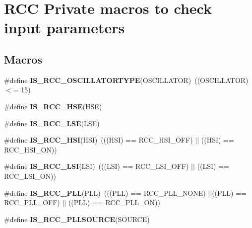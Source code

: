 \hypertarget{group___r_c_c___i_s___r_c_c___definitions}{}\section{R\+CC Private macros to check input parameters}
\label{group___r_c_c___i_s___r_c_c___definitions}
\subsection*{Macros}
\begin{DoxyCompactItemize}
\item 
\mbox{\label{group___r_c_c___i_s___r_c_c___definitions_ga3da0bb3923503cb8e84e5bd75912fbb8}} 
\#define {\bfseries I\+S\+\_\+\+R\+C\+C\+\_\+\+O\+S\+C\+I\+L\+L\+A\+T\+O\+R\+T\+Y\+PE}(O\+S\+C\+I\+L\+L\+A\+T\+OR)~((O\+S\+C\+I\+L\+L\+A\+T\+OR) $<$= 15)
\item 
\#define {\bfseries I\+S\+\_\+\+R\+C\+C\+\_\+\+H\+SE}(H\+SE)
\item 
\#define {\bfseries I\+S\+\_\+\+R\+C\+C\+\_\+\+L\+SE}(L\+SE)
\item 
\mbox{\label{group___r_c_c___i_s___r_c_c___definitions_ga9d2bad5b4ad9ba8fb224ddbd949c27d6}} 
\#define {\bfseries I\+S\+\_\+\+R\+C\+C\+\_\+\+H\+SI}(H\+SI)~(((H\+SI) == R\+C\+C\+\_\+\+H\+S\+I\+\_\+\+O\+FF) $\vert$$\vert$ ((H\+SI) == R\+C\+C\+\_\+\+H\+S\+I\+\_\+\+ON))
\item 
\mbox{\label{group___r_c_c___i_s___r_c_c___definitions_gaaa7381dd9821c69346ce64453863b786}} 
\#define {\bfseries I\+S\+\_\+\+R\+C\+C\+\_\+\+L\+SI}(L\+SI)~(((L\+SI) == R\+C\+C\+\_\+\+L\+S\+I\+\_\+\+O\+FF) $\vert$$\vert$ ((L\+SI) == R\+C\+C\+\_\+\+L\+S\+I\+\_\+\+ON))
\item 
\mbox{\label{group___r_c_c___i_s___r_c_c___definitions_ga373b85039eb8036373fe80948c153ee0}} 
\#define {\bfseries I\+S\+\_\+\+R\+C\+C\+\_\+\+P\+LL}(P\+LL)~(((P\+LL) == R\+C\+C\+\_\+\+P\+L\+L\+\_\+\+N\+O\+NE) $\vert$$\vert$((P\+LL) == R\+C\+C\+\_\+\+P\+L\+L\+\_\+\+O\+FF) $\vert$$\vert$ ((P\+LL) == R\+C\+C\+\_\+\+P\+L\+L\+\_\+\+ON))
\item 
\#define {\bfseries I\+S\+\_\+\+R\+C\+C\+\_\+\+P\+L\+L\+S\+O\+U\+R\+CE}(S\+O\+U\+R\+CE)

\end{DoxyCompactItemize}
